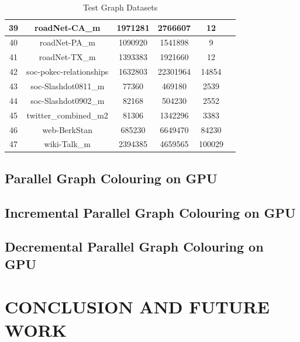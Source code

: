 \documentclass[MTech]{iitmdiss}
\begin{document}
\begin{table}[h]
\begin{tabular}{||c|c|c|c|c|c||}
\hline
39 & roadNet-CA\_m            & 1971281 & 2766607  & 12     & \cite{snapnets}    \\
\hline
40 & roadNet-PA\_m            & 1090920 & 1541898  & 9      & \cite{snapnets}    \\
\hline
41 & roadNet-TX\_m            & 1393383 & 1921660  & 12     & \cite{snapnets}    \\
\hline
42 & soc-pokec-relationships & 1632803 & 22301964 & 14854  & \cite{snapnets}    \\
\hline
43 & soc-Slashdot0811\_m      & 77360   & 469180   & 2539   & \cite{snapnets}    \\
\hline
44 & soc-Slashdot0902\_m      & 82168   & 504230   & 2552   & \cite{snapnets}    \\
\hline
45 & twitter\_combined\_m2     & 81306   & 1342296  & 3383   & \cite{snapnets}    \\
\hline
46 & web-BerkStan            & 685230  & 6649470  & 84230  & \cite{snapnets}    \\
\hline
47 & wiki-Talk\_m             & 2394385 & 4659565  & 100029 & \cite{snapnets}   
\\
\hline
\end{tabular}
\caption{Test Graph Datasets}
\label{table:4}
\end{table}

\section{Parallel Graph Colouring on GPU}
\section{Incremental Parallel Graph Colouring on GPU}
\section{Decremental Parallel Graph Colouring on GPU}
\chapter{CONCLUSION AND FUTURE WORK}


%
%
\end{document}
